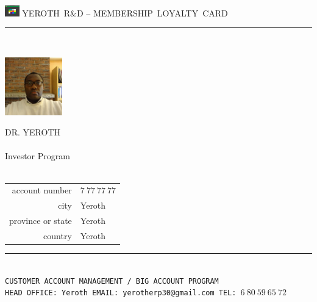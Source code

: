 \documentclass[11pt,a4paper]{memoir}
\begin{document}
    \begin{Spacing}{0.75}%
    \noindent
	\includegraphics[height=5mm]{../yeroth-erp-3-0-images/yeroth-erp-3-0-icon.png}
	{\tiny \emptyset \hfill \textcolor{yerothColorGold}{YEROTH~R\&D -- MEMBERSHIP~LOYALTY~CARD}}\\
    \vspace{-0.25em}
    \rule{74mm}{.3mm}\\
    \begin{minipage}[t]{33mm}
        \vspace{-0mm}%
        \includegraphics[height=25mm]{../doc/francais/images/XavierNOUNDOU-2}
    \end{minipage}
    \hspace{1mm}
    \begin{minipage}[t]{42mm}
        \vspace{-0mm}%
        \begin{flushleft}
        {\scriptsize
            \begin{Spacing}{1}%
            \textcolor{yerothColorGold}{DR. YEROTH}\\
            \hspace{5mm} \\
            \hspace{5mm} Investor Program \\
            \hspace{5mm} \vspace{2mm}\\
            \end{Spacing}
        }
        {\tiny
        	\begin{tabular}{rl}
            	{\color{gray}account number} & $7\ 77\ 77\ 77$\\
            	{\color{gray}city} & Yeroth\\
            	{\color{gray}province or state} & Yeroth\\
            	{\color{gray}country} & Yeroth\\
            \end{tabular}
            \vspace*{3mm}
        }
        \end{flushleft}
    \end{minipage}
    \rule{74mm}{0mm}\\
    \vspace{-0.45em}
    \hspace*{-0.45em}
    \texttt{\fontsize{1.83mm}{3.55mm}\selectfont CUSTOMER ACCOUNT MANAGEMENT~/~BIG ACCOUNT PROGRAM \\
    \hspace*{-0.59em}
    \texttt{\fontsize{1.83mm}{3.55mm}\selectfont HEAD OFFICE: Yeroth \bullet{} EMAIL: yerotherp30@gmail.com \bullet{} TEL: $6\ 80\ 59\ 65\ 72$}}
    \end{Spacing}
\end{document}
